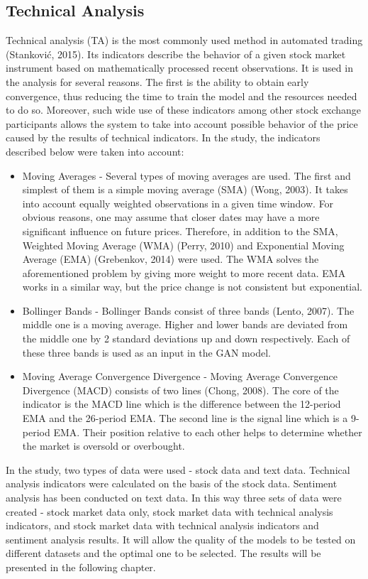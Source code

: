\documentclass[11pt]{article} %
\begin{document}
\subsection{Technical Analysis}
Technical analysis (TA) is the most commonly used method in automated trading (Stanković, 2015). Its indicators describe the behavior of a given stock market instrument based on mathematically processed recent observations. It is used in the analysis for several reasons. The first is the ability to obtain early convergence, thus reducing the time to train the model and the resources needed to do so. Moreover, such wide use of these indicators among other stock exchange participants allows the system to take into account possible behavior of the price caused by the results of technical indicators. In the study, the indicators described below were taken into account: 
\begin{itemize}
\item Moving Averages - Several types of moving averages are used. The first and simplest of them is a simple moving average (SMA) (Wong, 2003). It takes into account equally weighted observations in a given time window. For obvious reasons, one may assume that closer dates may have a more significant influence on future prices. Therefore, in addition to the SMA, Weighted Moving Average (WMA) (Perry, 2010) and Exponential Moving Average (EMA) (Grebenkov, 2014) were used. The WMA solves the aforementioned problem by giving more weight to more recent data. EMA works in a similar way, but the price change is not consistent but exponential.

\item Bollinger Bands - Bollinger Bands consist of three bands (Lento, 2007). The middle one is a moving average. Higher and lower bands are deviated from the middle one by 2 standard deviations up and down respectively. Each of these three bands is used as an input in the GAN model.

\item Moving Average Convergence Divergence - Moving Average Convergence Divergence (MACD) consists of two lines (Chong, 2008). The core of the indicator is the MACD line which is the difference between the 12-period EMA and the 26-period EMA. The second line is the signal line which is a 9-period EMA. Their position relative to each other helps to determine whether the market is oversold or overbought.
\end{itemize}

In the study, two types of data were used - stock data and text data. Technical analysis indicators were calculated on the basis of the stock data. Sentiment analysis has been conducted on text data. In this way three sets of data were created - stock market data only, stock market data with technical analysis indicators, and stock market data with technical analysis indicators and sentiment analysis results. It will allow the quality of the models to be tested on different datasets and the optimal one to be selected. The results will be presented in the following chapter. 
\end{document}
